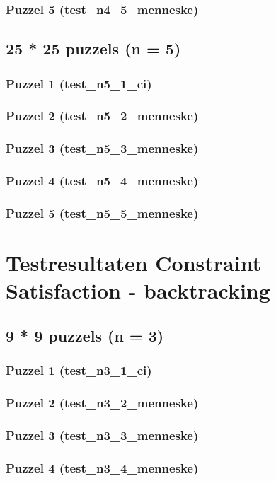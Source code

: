 \documentclass[]{report}
\begin{document}
\begin{appendices}
\subsection{Puzzel 5 (test\_n4\_5\_menneske)}
\section{25 * 25 puzzels (n = 5)}
\subsection{Puzzel 1 (test\_n5\_1\_ci)}

\subsection{Puzzel 2 (test\_n5\_2\_menneske)}
\subsection{Puzzel 3 (test\_n5\_3\_menneske)}
\subsection{Puzzel 4 (test\_n5\_4\_menneske)}
\subsection{Puzzel 5 (test\_n5\_5\_menneske)}

\chapter{Testresultaten Constraint Satisfaction - backtracking}
\section{9 * 9 puzzels (n = 3)}
\subsection{Puzzel 1 (test\_n3\_1\_ci)}

\subsection{Puzzel 2 (test\_n3\_2\_menneske)}
\subsection{Puzzel 3 (test\_n3\_3\_menneske)}
\subsection{Puzzel 4 (test\_n3\_4\_menneske)}

\end{appendices}
\end{document}
